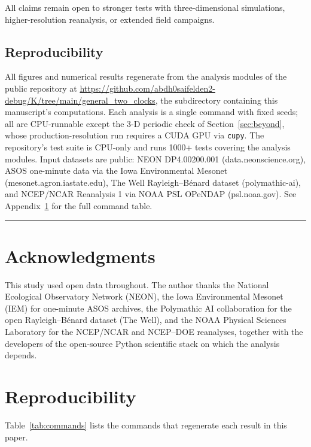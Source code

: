 \documentclass[aps,prfluids,preprint,superscriptaddress,nofootinbib]{revtex4-2}
\begin{document}
All claims remain open to stronger tests with three-dimensional simulations, higher-resolution reanalysis, or extended field campaigns.

\subsection{Reproducibility}

All figures and numerical results regenerate from the analysis modules of the public repository at \url{https://github.com/abdh0saifelden2-debug/K/tree/main/general_two_clocks}, the subdirectory containing this manuscript's computations. Each analysis is a single command with fixed seeds; all are CPU-runnable except the 3-D periodic check of Section~\ref{sec:beyond}, whose production-resolution run requires a CUDA GPU via \texttt{cupy}. The repository's test suite is CPU-only and runs 1000+ tests covering the analysis modules. Input datasets are public: NEON DP4.00200.001 (data.\allowbreak neonscience.org), ASOS one-minute data via the Iowa Environmental Mesonet (mesonet.\allowbreak agron.\allowbreak iastate.edu), The Well Rayleigh--B\'enard dataset (polymathic-ai), and NCEP/NCAR Reanalysis 1 via NOAA PSL OPeNDAP (psl.\allowbreak noaa.gov). See Appendix~\ref{app:reproducibility} for the full command table.

\medskip\hrule\medskip

\section*{Acknowledgments}

This study used open data throughout. The author thanks the National Ecological Observatory Network (NEON), the Iowa Environmental Mesonet (IEM) for one-minute ASOS archives, the Polymathic AI collaboration for the open Rayleigh--B\'enard dataset (The Well), and the NOAA Physical Sciences Laboratory for the NCEP/NCAR and NCEP--DOE reanalyses, together with the developers of the open-source Python scientific stack on which the analysis depends.

\appendix

\section{Reproducibility}
\label{app:reproducibility}

Table~\ref{tab:commands} lists the commands that regenerate each result in this paper.
\end{document}
